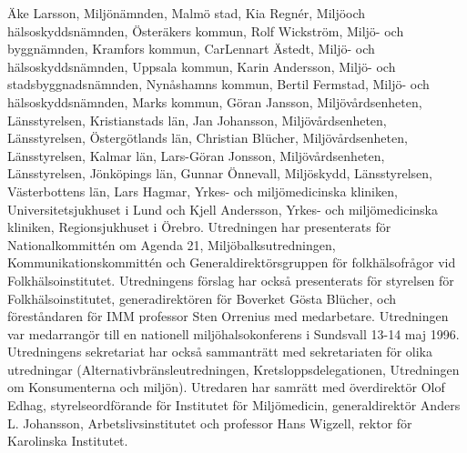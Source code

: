 Äke Larsson, Miljönämnden, Malmö stad, Kia Regnér, Miljöoch hälsoskyddsnämnden, Österäkers kommun, Rolf Wickström, Miljö- och byggnämnden, Kramfors kommun, CarLennart Ästedt, Miljö- och hälsoskyddsnämnden, Uppsala kommun, Karin Andersson, Miljö- och stadsbyggnadsnämnden, Nynåshamns kommun, Bertil Fermstad, Miljö- och hälsoskyddsnämnden, Marks kommun, Göran Jansson, Miljövårdsenheten, Länsstyrelsen, Kristianstads län, Jan Johansson, Miljövårdsenheten, Länsstyrelsen, Östergötlands län, Christian Blücher, Miljövårdsenheten, Länsstyrelsen, Kalmar län, Lars-Göran Jonsson, Miljövårdsenheten, Länsstyrelsen, Jönköpings län, Gunnar Önnevall, Miljöskydd, Länsstyrelsen, Västerbottens län, Lars Hagmar, Yrkes- och miljömedicinska kliniken, Universitetsjukhuset i Lund och Kjell Andersson, Yrkes- och miljömedicinska kliniken, Regionsjukhuset i Örebro.
Utredningen har presenterats för Nationalkommittén om Agenda 21, Miljöbalksutredningen, Kommunikationskommittén och Generaldirektörsgruppen för folkhälsofrågor vid Folkhälsoinstitutet. Utredningens förslag har också presenterats för styrelsen för Folkhälsoinstitutet, generadirektören för Boverket Gösta Blücher, och föreståndaren för IMM professor Sten Orrenius med medarbetare. Utredningen var medarrangör till en nationell miljöhalsokonferens i Sundsvall 13-14 maj 1996. Utredningens sekretariat har också sammanträtt med sekretariaten för olika utredningar (Alternativbränsleutredningen, Kretsloppsdelegationen, Utredningen om Konsumenterna och miljön). Utredaren har samrätt med överdirektör Olof Edhag, styrelseordförande för Institutet för Miljömedicin, generaldirektör Anders L. Johansson, Arbetslivsinstitutet och professor Hans Wigzell, rektor för Karolinska Institutet.

